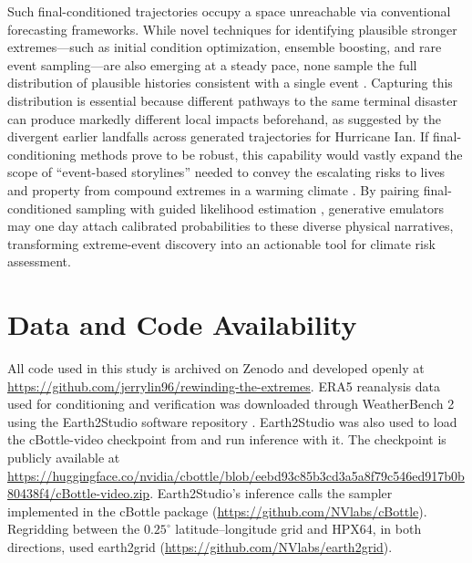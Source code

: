 \documentclass[final]{agujournal2019}
\begin{document}
Such final-conditioned trajectories occupy a space unreachable via conventional forecasting frameworks. While novel techniques for identifying plausible stronger extremes---such as initial condition optimization, ensemble boosting, and rare event sampling---are also emerging at a steady pace, none sample the full distribution of plausible histories consistent with a single event \cite{Ragone2018-rj, Gessner2021-qy, Finkel2024-ln, Finkel2026-wn, Whittaker2026-fe, Hakim2026-oy, Lancelin2026-om}. Capturing this distribution is essential because different pathways to the same terminal disaster can produce markedly different local impacts beforehand, as suggested by the divergent earlier landfalls across generated trajectories for Hurricane Ian. If final-conditioning methods prove to be robust, this capability would vastly expand the scope of ``event-based storylines'' needed to convey the escalating risks to lives and property from compound extremes in a warming climate \cite{Shepherd2018-zo, Baldwin2019-ec, Sillmann2021-jl, Keys2023-zx, Whittaker2026-fe}. By pairing final-conditioned sampling with guided likelihood estimation \cite{Manshausen2026-nu}, generative emulators may one day attach calibrated probabilities to these diverse physical narratives, transforming extreme-event discovery into an actionable tool for climate risk assessment.

\section*{Data and Code Availability}

All code used in this study is archived on Zenodo \cite{lin_2026_22000716} and developed openly at \url{https://github.com/jerrylin96/rewinding-the-extremes}. ERA5 reanalysis data \cite{Hersbach2020-oh} used for conditioning and verification was downloaded through WeatherBench 2 \cite{rasp2023weatherbench} using the Earth2Studio software repository \cite{Earth2Studio_Contributors_NVIDIA_Earth2Studio_2024}. Earth2Studio was also used to load the cBottle-video checkpoint from  and run inference with it. The checkpoint is publicly available at \url{https://huggingface.co/nvidia/cbottle/blob/eebd93c85b3cd3a5a8f79c546ed917b0b80438f4/cBottle-video.zip}. Earth2Studio's inference calls the sampler implemented in the cBottle package (\url{https://github.com/NVlabs/cBottle}). Regridding between the $0.25^{\circ}$ latitude--longitude grid and HPX64, in both directions, used earth2grid (\url{https://github.com/NVlabs/earth2grid}).
\end{document}
